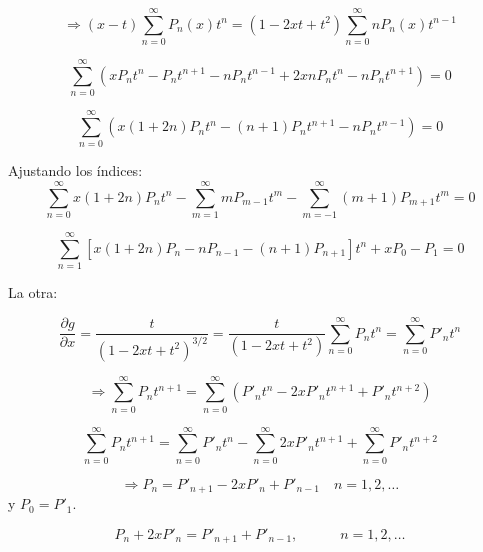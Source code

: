 \begin{itemize}
\begin{equation}
    \Rightarrow (x-t) \sum_{n=0}^{\infty} P_n(x) t^n = (1-2xt+t^2) \sum_{n=0}^{\infty} n P_n(x) t^{n-1}
\end{equation}

\begin{equation}
    \sum_{n=0}^{\infty} (x P_n t^n - P_n t^{n+1} - n P_n t^{n-1} + 2x n P_n t^n - n P_n t^{n+1}) = 0
\end{equation}

\begin{equation}
    \sum_{n=0}^{\infty} (x(1+2n) P_n t^n - (n+1) P_n t^{n+1} - n P_n t^{n-1}) = 0
\end{equation}

Ajustando los índices:
\begin{equation}
    \sum_{n=0}^{\infty} x(1+2n) P_n t^n - \sum_{m=1}^{\infty} m P_{m-1} t^m - \sum_{m=-1}^{\infty} (m+1) P_{m+1} t^m = 0
\end{equation}

\begin{equation}
    \sum_{n=1}^{\infty} [x(1+2n) P_n - n P_{n-1} - (n+1) P_{n+1}] t^n + x P_0 - P_1 = 0
\end{equation}



La otra:

\begin{equation}
    \frac{\partial g}{\partial x} = \frac{t}{(1-2xt+t^2)^{3/2}} = \frac{t}{(1-2xt+t^2)} \sum_{n=0}^{\infty} P_n t^n = \sum_{n=0}^{\infty} P'_n t^n
\end{equation}

\begin{equation}
    \Rightarrow \sum_{n=0}^{\infty} P_n t^{n+1} = \sum_{n=0}^{\infty} (P'_n t^n - 2x P'_n t^{n+1} + P'_n t^{n+2})
\end{equation}

\begin{equation}
    \sum_{n=0}^{\infty} P_n t^{n+1} = \sum_{n=0}^{\infty} P'_n t^n - \sum_{n=0}^{\infty} 2x P'_n t^{n+1} + \sum_{n=0}^{\infty} P'_n t^{n+2}
\end{equation}

\begin{equation}
    \Rightarrow P_n = P'_{n+1} - 2x P'_n + P'_{n-1} \quad n=1,2, \dots
\end{equation}
y $P_0 = P'_1$.

\begin{equation}\label{Pn+xPpn1}
    P_n + 2x P'_n = P'_{n+1} + P'_{n-1}, \qquad \quad n=1,2,\dots
\end{equation}


\end{itemize}

